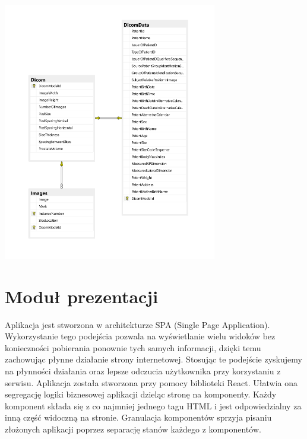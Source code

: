 \documentclass[a4paper,11pt,twoside]{report}
\theoremstyle{definition}
\begin{document}
\begin{minipage}[H]{\linewidth}
	\centering
	\includegraphics[width=0.7\textwidth]{Backend/SchematBazy.png}
\end{minipage}

\section{Moduł prezentacji}
Aplikacja jest stworzona w architekturze SPA (Single Page Application). Wykorzystanie tego podejścia pozwala na wyświetlanie wielu widoków bez konieczności pobierania ponownie tych samych informacji, dzięki temu zachowując płynne działanie strony internetowej. Stosując te podejście zyskujemy na płynności działania oraz lepsze odczucia użytkownika przy korzystaniu z serwisu. Aplikacja została stworzona przy pomocy biblioteki React. Ułatwia ona segregację logiki biznesowej aplikacji dzieląc stronę na komponenty. Każdy komponent składa się z co najmniej jednego tagu HTML  i jest odpowiedzialny za inną część widoczną na stronie. Granulacja komponentów sprzyja pisaniu złożonych aplikacji poprzez separację stanów każdego z komponentów.
\end{document}
